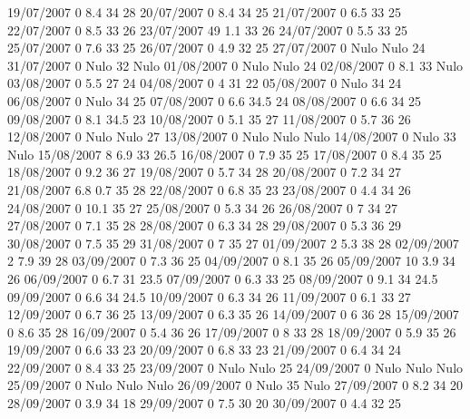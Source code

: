 19/07/2007  0      8.4    34     28 
20/07/2007  0      8.4    34     25 
21/07/2007  0      6.5    33     25 
22/07/2007  0      8.5    33     26 
23/07/2007  49     1.1    33     26 
24/07/2007  0      5.5    33     25 
25/07/2007  0      7.6    33     25 
26/07/2007  0      4.9    32     25 
27/07/2007  0     Nulo   Nulo    24 
31/07/2007  0     Nulo    32    Nulo
01/08/2007  0     Nulo   Nulo    24 
02/08/2007  0      8.1    33    Nulo
03/08/2007  0      5.5    27     24 
04/08/2007  0      4      31     22 
05/08/2007  0     Nulo    34     24 
06/08/2007  0     Nulo    34     25 
07/08/2007  0      6.6    34.5   24 
08/08/2007  0      6.6    34     25 
09/08/2007  0      8.1    34.5   23 
10/08/2007  0      5.1    35     27 
11/08/2007  0      5.7    36     26 
12/08/2007  0     Nulo   Nulo    27 
13/08/2007  0     Nulo   Nulo   Nulo
14/08/2007  0     Nulo    33    Nulo
15/08/2007  8      6.9    33     26.5 
16/08/2007  0      7.9    35     25 
17/08/2007  0      8.4    35     25 
18/08/2007  0      9.2    36     27 
19/08/2007  0      5.7    34     28 
20/08/2007  0      7.2    34     27 
21/08/2007  6.8    0.7    35     28 
22/08/2007  0      6.8    35     23 
23/08/2007  0      4.4    34     26 
24/08/2007  0      10.1   35     27 
25/08/2007  0      5.3    34     26 
26/08/2007  0      7      34     27 
27/08/2007  0      7.1    35     28 
28/08/2007  0      6.3    34     28 
29/08/2007  0      5.3    36     29 
30/08/2007  0      7.5    35     29 
31/08/2007  0      7      35     27 
01/09/2007  2      5.3    38     28 
02/09/2007  2      7.9    39     28 
03/09/2007  0      7.3    36     25 
04/09/2007  0      8.1    35     26 
05/09/2007  10     3.9    34     26 
06/09/2007  0      6.7    31     23.5 
07/09/2007  0      6.3    33     25 
08/09/2007  0      9.1    34     24.5 
09/09/2007  0      6.6    34     24.5 
10/09/2007  0      6.3    34     26 
11/09/2007  0      6.1    33     27 
12/09/2007  0      6.7    36     25 
13/09/2007  0      6.3    35     26 
14/09/2007  0      6      36     28 
15/09/2007  0      8.6    35     28 
16/09/2007  0      5.4    36     26 
17/09/2007  0      8      33     28 
18/09/2007  0      5.9    35     26 
19/09/2007  0      6.6    33     23 
20/09/2007  0      6.8    33     23 
21/09/2007  0      6.4    34     24 
22/09/2007  0      8.4    33     25 
23/09/2007  0     Nulo   Nulo    25 
24/09/2007  0     Nulo   Nulo   Nulo
25/09/2007  0     Nulo   Nulo   Nulo
26/09/2007  0     Nulo    35    Nulo
27/09/2007  0      8.2    34     20 
28/09/2007  0      3.9    34     18 
29/09/2007  0      7.5    30     20 
30/09/2007  0      4.4    32     25 

